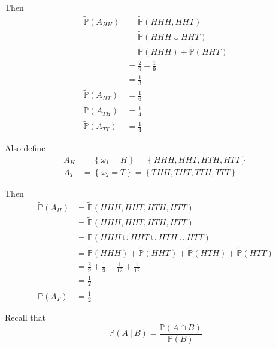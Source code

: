 \documentclass[12pt]{article}
\renewcommand{\P}{\mathbb P}
\begin{document}
Then
\begin{align*}
	\tilde{\P}(A_{HH}) &= \tilde{\P}\left( HHH, HHT \right) \\
	&= \tilde{\P}\left(HHH \cup HHT \right) \\
	&= \tilde{\P}(HHH) + \tilde{\P}(HHT) \\
	&= \frac{2}{9} + \frac{1}{9} \\
	&= \frac{1}{3} \\
	\tilde{\P}(A_{HT}) &= \frac{1}{6} \\
	\tilde{\P}(A_{TH}) &= \frac{1}{4} \\
	\tilde{\P}(A_{TT}) &= \frac{1}{4}
\end{align*}

Also define
\begin{align*}
	A_H &= \left\{\omega_1 = H \right\} = \left\{HHH, HHT, HTH, HTT \right\} \\
	A_T &= \left\{\omega_2 = T \right\} = \left\{THH, THT, TTH, TTT \right\}
\end{align*}

Then
\begin{align*}
	\tilde{\P}(A_H) &= \tilde{\P}(HHH, HHT, HTH, HTT) \\
	&= \tilde{\P}( HHH, HHT, HTH, HTT ) \\
	&= \tilde{\P}( HHH \cup HHT \cup HTH \cup HTT ) \\
	&= \tilde{\P}(HHH) + \tilde{\P}(HHT) + \tilde{\P}(HTH) + \tilde{\P}(HTT) \\
	&= \frac{2}{9} + \frac{1}{9} + \frac{1}{12} + \frac{1}{12} \\
	&= \frac{1}{2} \\
	\tilde{\P}(A_T) &= \frac{1}{2}
\end{align*}

Recall that 
\begin{equation*}
	\P(A~|~B) = \frac{ \P(A\cap B) }{ \P(B) }
\end{equation*}
\end{document}

